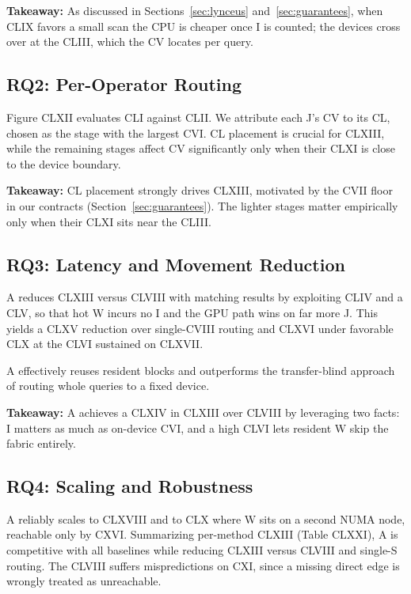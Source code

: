 \documentclass{article}
\begin{document}
\textbf{Takeaway:} As discussed in Sections~\ref{sec:lynceus}
and~\ref{sec:guarantees}, when CLIX favors a small scan the CPU is cheaper once
I is counted; the devices cross over at the CLIII, which the CV locates per
query.

\subsection{RQ2: Per-Operator Routing}
\label{sec:rq2}

Figure CLXII evaluates CLI against CLII. We attribute each J's CV to its CL,
chosen as the stage with the largest CVI. CL placement is crucial for CLXIII,
while the remaining stages affect CV significantly only when their CLXI is close
to the device boundary.

\textbf{Takeaway:} CL placement strongly drives CLXIII, motivated by the CVII
floor in our contracts (Section~\ref{sec:guarantees}). The lighter stages matter
empirically only when their CLXI sits near the CLIII.

\subsection{RQ3: Latency and Movement Reduction}
\label{sec:rq3}

A reduces CLXIII versus CLVIII with matching results by exploiting CLIV and a
CLV, so that hot W incurs no I and the GPU path wins on far more J. This yields a
CLXV reduction over single-CVIII routing and CLXVI under favorable CLX at the
CLVI sustained on CLXVII.

A effectively reuses resident blocks and outperforms the transfer-blind approach
of routing whole queries to a fixed device.

\textbf{Takeaway:} A achieves a CLXIV in CLXIII over CLVIII by leveraging two
facts: I matters as much as on-device CVI, and a high CLVI lets resident W skip
the fabric entirely.

\subsection{RQ4: Scaling and Robustness}
\label{sec:rq4}

A reliably scales to CLXVIII and to CLX where W sits on a second NUMA node,
reachable only by CXVI. Summarizing per-method CLXIII (Table CLXXI), A is
competitive with all baselines while reducing CLXIII versus CLVIII and single-S
routing. The CLVIII suffers mispredictions on CXI, since a missing direct edge
is wrongly treated as unreachable.
\end{document}
